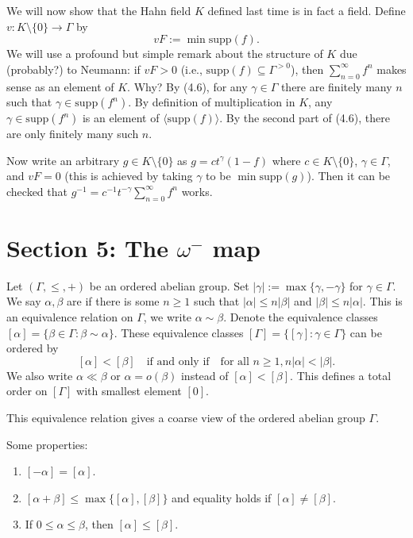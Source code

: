 
We will now show that the Hahn field $K$ defined last time is in fact a field. Define $v:K\setminus \{0\}\rightarrow \Gamma$ by $$vF:=\min \mathrm{supp}(f).$$ We will use a profound but simple remark about the structure of $K$ due (probably?) to Neumann: if $vF>0$ (i.e., $\mathrm{supp}(f)\subseteq \Gamma^{>0}$), then $\sum_{n=0}^\infty f^n$ makes sense as an element of $K$. Why? By (4.6), for any $\gamma\in \Gamma$ there are finitely many $n$ such that $\gamma\in\mathrm{supp}(f^n)$. By definition of multiplication in $K$, any $\gamma\in \mathrm{supp}(f^n)$ is an element of $\langle \mathrm{supp}(f)\rangle$. By the second part of (4.6), there are only finitely many such $n$.

Now write an arbitrary $g\in K\setminus \{0\}$ as $g=ct^\gamma(1-f)$ where $c\in K\setminus \{0\}$, $\gamma\in \Gamma$, and $vF=0$ (this is achieved by taking $\gamma$ to be $\min\mathrm{supp}(g)$). Then it can be checked that $g^{-1}=c^{-1}t^{-\gamma}\sum_{n=0}^\infty f^n$ works.

\section{ Section 5: The $\omega^-$ map }
Let $(\Gamma, \le, +)$ be an ordered abelian group. Set $|\gamma|:=\max\{\gamma, -\gamma\}$ for $\gamma\in \Gamma$. We say $\alpha,\beta$ are  if there is some $n\ge 1$ such that $|\alpha|\le n|\beta|$ and $|\beta|\le n|\alpha|$. This is an equivalence relation on $\Gamma$, we write $\alpha\sim\beta$. Denote the equivalence classes $[\alpha]=\{\beta\in\Gamma:\beta\sim\alpha\}$. These equivalence classes $[\Gamma]=\{[\gamma]:\gamma\in\Gamma\}$ can be ordered by 
$$[\alpha]<[\beta]\quad \textrm{if and only if} \quad \textrm{for all }n\ge 1, n|\alpha|<|\beta|.$$
We also write $\alpha\ll\beta$ or $\alpha=o(\beta)$ instead of $[\alpha]<[\beta]$. This defines a total order on $[\Gamma]$ with smallest element $[0]$.

This equivalence relation gives a coarse view of the ordered abelian group $\Gamma$.

Some properties:
\begin{enumerate}
  \item  $[-\alpha]=[\alpha]$.
  \item  $[\alpha+\beta]\le \max\{[\alpha],[\beta]\}$ and equality holds if $[\alpha]\neq [\beta]$.
  \item  If $0\le \alpha\le \beta$, then $[\alpha]\le [\beta]$.
\end{enumerate}


